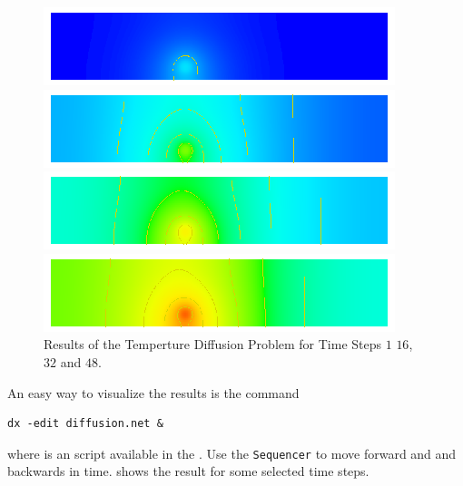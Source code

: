 \begin{figure}
\centerline{\includegraphics[width=\figwidth]{DiffusionRes1}}
\centerline{\includegraphics[width=\figwidth]{DiffusionRes16}}
\centerline{\includegraphics[width=\figwidth]{DiffusionRes32}}
\centerline{\includegraphics[width=\figwidth]{DiffusionRes48}}
\caption{Results of the Temperture Diffusion Problem for Time Steps $1$ $16$, $32$ and $48$.}
\label{DIFFUSION FIG 2}
\end{figure}

An easy way to visualize the results is the command
\begin{verbatim}
dx -edit diffusion.net &
\end{verbatim}
where  is an \OpenDX script available in the \ExampleDirectory.
Use the \texttt{Sequencer} to move forward and and backwards in time. 
 shows the result for some selected time steps.
